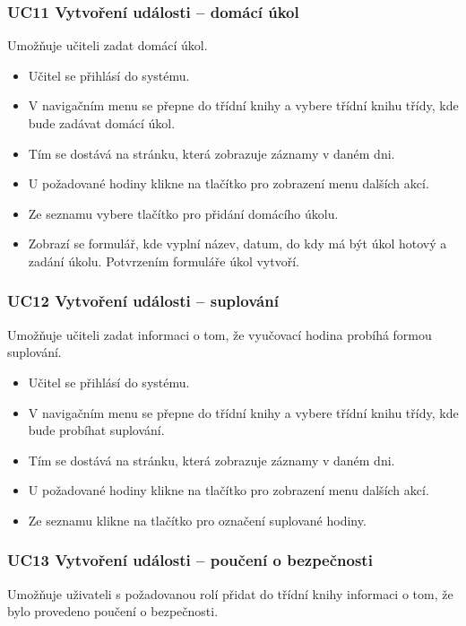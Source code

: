 \subsubsection*{UC11 Vytvoření události -- domácí úkol}
Umožňuje učiteli zadat domácí úkol.
\begin{itemize}
    \item Učitel se přihlásí do systému.
    \item V navigačním menu se přepne do třídní knihy a vybere třídní knihu třídy, kde bude zadávat domácí úkol.
    \item Tím se dostává na stránku, která zobrazuje záznamy v daném dni.
    \item U požadované hodiny klikne na tlačítko pro zobrazení menu dalších akcí. 
    \item Ze seznamu vybere tlačítko pro přidání domácího úkolu.
    \item Zobrazí se formulář, kde vyplní název, datum, do kdy má být úkol hotový a zadání úkolu. Potvrzením formuláře úkol vytvoří.
\end{itemize}


\subsubsection*{UC12 Vytvoření události -- suplování}
Umožňuje učiteli zadat informaci o tom, že vyučovací hodina probíhá formou suplování.

\begin{itemize}
    \item Učitel se přihlásí do systému.
    \item V navigačním menu se přepne do třídní knihy a vybere třídní knihu třídy, kde bude probíhat suplování.
    \item Tím se dostává na stránku, která zobrazuje záznamy v daném dni.
    \item U požadované hodiny klikne na tlačítko pro zobrazení menu dalších akcí.
    \item Ze seznamu klikne na tlačítko pro označení suplované hodiny.
\end{itemize}
\subsubsection*{UC13 Vytvoření události -- poučení o bezpečnosti}
Umožňuje uživateli s požadovanou rolí přidat do třídní knihy informaci o tom, že bylo provedeno poučení o bezpečnosti.

